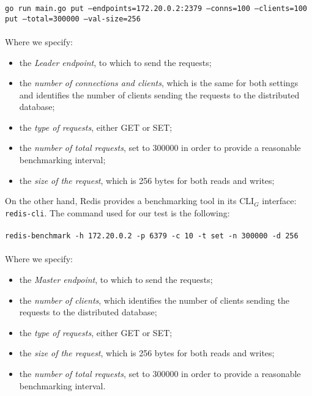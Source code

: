 \texttt{go run main.go put --endpoints=172.20.0.2:2379 --conns=100 --clients=100 put
--total=300000 --val-size=256} \\ \\
Where we specify:
\begin{itemize}
	\item the \textit{Leader endpoint}, to which to send the requests;
	\item the \textit{number of connections and clients}, which is the same for both settings and identifies the number of clients sending the requests to the distributed database;
	\item the \textit{type of requests}, either GET or SET;
	\item the \textit{number of total requests}, set to 300000 in order to provide a reasonable benchmarking interval;
	\item the \textit{size of the request}, which is 256 bytes for both reads and writes;
\end{itemize}
On the other hand, Redis provides a benchmarking tool in its CLI$_G$ interface: \texttt{redis-cli}. The command used for our test is the following: \\ \\
\texttt{redis-benchmark -h 172.20.0.2 -p 6379 -c 10 -t set -n 300000 -d 256} \\ \\
Where we specify:
\begin{itemize}
	\item the \textit{Master endpoint}, to which to send the requests;
	\item the \textit{number of clients}, which identifies the number of clients sending the requests to the distributed database;
	\item the \textit{type of requests}, either GET or SET;
	\item the \textit{size of the request}, which is 256 bytes for both reads and writes;
	\item the \textit{number of total requests}, set to 300000 in order to provide a reasonable benchmarking interval.
\end{itemize}

